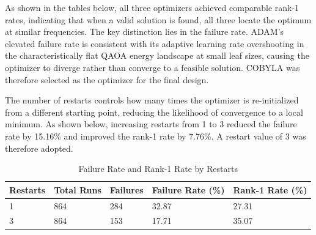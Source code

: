\documentclass[a4paper]{report}
\begin{document}
{\begin{itemize}
\begin{itemize}
As shown in the tables below, all three optimizers achieved comparable rank-1 
rates, indicating that when a valid solution is found, all three locate the optimum 
at similar frequencies. The key distinction lies in the failure rate. ADAM's 
elevated failure rate is consistent with its adaptive learning rate overshooting 
in the characteristically flat QAOA energy landscape at small leaf sizes, causing 
the optimizer to diverge rather than converge to a feasible solution. COBYLA was 
therefore selected as the optimizer for the final design.

\begin{table}[htbp]
    \centering
    \caption{Failure and Rank-1 Rates by Optimizer}
    \label{tab:optimizer_rates}
\end{table}

The number of restarts controls how many times the optimizer is re-initialized 
from a different starting point, reducing the likelihood of convergence to a local 
minimum. As shown below, increasing restarts from 1 to 3 reduced the failure rate 
by 15.16\% and improved the rank-1 rate by 7.76\%. A restart value of 3 was 
therefore adopted.

\begin{table}[!ht]
\centering
\begin{tabular}{@{}lllll@{}}
\toprule
\textbf{Restarts} & \textbf{Total Runs} & \textbf{Failures} & 
\textbf{Failure Rate (\%)} & \textbf{Rank-1 Rate (\%)} \\ \midrule
1 & 864 & 284 & 32.87 & 27.31 \\
3 & 864 & 153 & 17.71 & 35.07 \\ \bottomrule
\end{tabular}
\caption{Failure Rate and Rank-1 Rate by Restarts}
\label{tab:restarts-failure-rank}
\end{table}


\end{itemize}
\end{itemize}}
\end{document}
